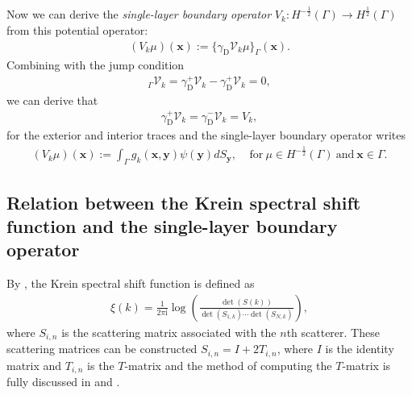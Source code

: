 Now we can derive the \emph{single-layer boundary operator}
$V_{k}: H^{-\frac{1}{2}}(\Gamma)\rightarrow H^{\frac{1}{2}}(\Gamma)$ from this potential operator:
\begin{align*}
    (V_{k}\mu)(\boldsymbol{x}) := \{\gamma_{\text{D}}\mathcal{V}_{k}\mu\}_{\Gamma}(\boldsymbol{x}).
\end{align*}
Combining with the jump condition
\begin{align*}
    [\gamma_{\text{D}}]_{\Gamma}\mathcal{V}_{k} = \gamma_{\text{D}}^{+}\mathcal{V}_{k} - \gamma_{\text{D}}^{+}\mathcal{V}_{k} = 0, 
\end{align*}
we can derive that 
\begin{align*}
    \gamma_{\text{D}}^{+}\mathcal{V}_{k} = \gamma_{\text{D}}^{-}\mathcal{V}_{k} = V_{k},
\end{align*}
for the exterior and interior traces and the single-layer boundary operator writes 
\begin{align*}
    (V_{k}\mu)(\boldsymbol{x}) := \int_{\Gamma}g_{k}(\boldsymbol{x},\boldsymbol{y})\psi(\boldsymbol{y})dS_{\boldsymbol{y}}, \ \ \ \ \ 
    \text{for}\ \mu\in H^{-\frac{1}{2}}(\Gamma) \  \text{and} \ \boldsymbol{x}\in\Gamma.
\end{align*}
\subsection{Relation between the Krein spectral shift function and the single-layer boundary operator}
By \cite{hanisch2020relative}, the Krein spectral shift function is defined as 
\begin{align*}
    \xi(k) = \frac{1}{2\pi \mathrm{i}}\log\left(\frac{\det(S(k))}{\det(S_{1,k})\cdots\det(S_{N,k})}\right),
\end{align*}
where $S_{i,n}$ is the scattering matrix associated with the $n$th scatterer. These scattering matrices can be constructed  $S_{i,n} = I + 2T_{i,n}$, where 
$I$ is the identity matrix and $T_{i,n}$ is the $T$-matrix and the method of computing the $T$-matrix is fully discussed in \cite{waterman1969new} and 
\cite{ganesh2008far}.


